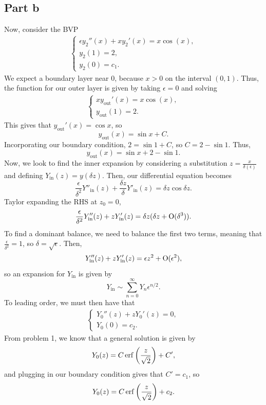 \documentclass{article}
\begin{document}
\subsection{Part b}
Now, consider the BVP 
\begin{align*}
    \begin{cases} \epsilon y_2''(x) + x y_2'(x) = x \cos(x),\\
      y_2(1) = 2,\\
      y_2(0) = c_1. \end{cases}
  \end{align*}
We expect a boundary layer near 0, because $x>0$ on the interval $(0,1)$. Thus, the function for our outer layer is given by taking $\epsilon=0$ and solving
\begin{align*}
    \begin{cases} x y_{\text{out}}'(x) = x \cos(x),\\
      y_{\text{out}}(1) = 2. \end{cases}
  \end{align*}
This gives that $y_{\text{out}}'(x)=\cos x$, so 
\[
y_{\text{out}}(x)=\sin x+C.
\]
Incorporating our boundary condition, $2=\sin1+C$, so $C=2-\sin1$. Thus,
\[
y_{\text{out}}(x)=\sin x+2-\sin1.
\]
Now, we look to find the inner expansion by considering a substitution $z=\frac{x}{\delta(\epsilon)}$ and defining $Y_{\text{in}}(z)=y(\delta z)$. Then, our differential equation becomes 
\[
\frac{\epsilon}{\delta^2}Y''_{\text{in}}(z)+\frac{\delta z}{\delta}Y'_{\text{in}}(z)=\delta z\cos{\delta z}.
\]
Taylor expanding the RHS at $z_0=0$,
\[
\frac{\epsilon}{\delta^2}Y''_{\text{in}}(z)+zY'_{\text{in}}(z)=\delta z(\delta z+\operatorname{O}(\delta^3)).
\]
To find a dominant balance, we need to balance the first two terms, meaning that $\frac{\epsilon}{\delta^2}=1$, so $\delta=\sqrt{\epsilon}$. Then, 
\[
Y''_{\text{in}}(z)+zY'_{\text{in}}(z)=\epsilon z^2+\operatorname{O}(\epsilon^2),
\]
so an expansion for $Y_{\text{in}}$ is given by 
\[
Y_{\text{in}}\sim\sum_{n=0}^\infty Y_n\epsilon^{n/2}.
\]
To leading order, we must then have that 
\begin{align*}
    \begin{cases} Y_0''(z)+zY_0'(z) = 0,\\
      Y_0(0) = c_2. \end{cases}
  \end{align*}
From problem 1, we know that a general solution is given by
\[
Y_0(z)=C\operatorname{erf}\left(\frac{z}{\sqrt{2}}\right)+C',
\]
and plugging in our boundary condition gives that $C'=c_1$, so
\[
Y_0(z)=C\operatorname{erf}\left(\frac{z}{\sqrt{2}}\right)+c_2.
\]
\end{document}
